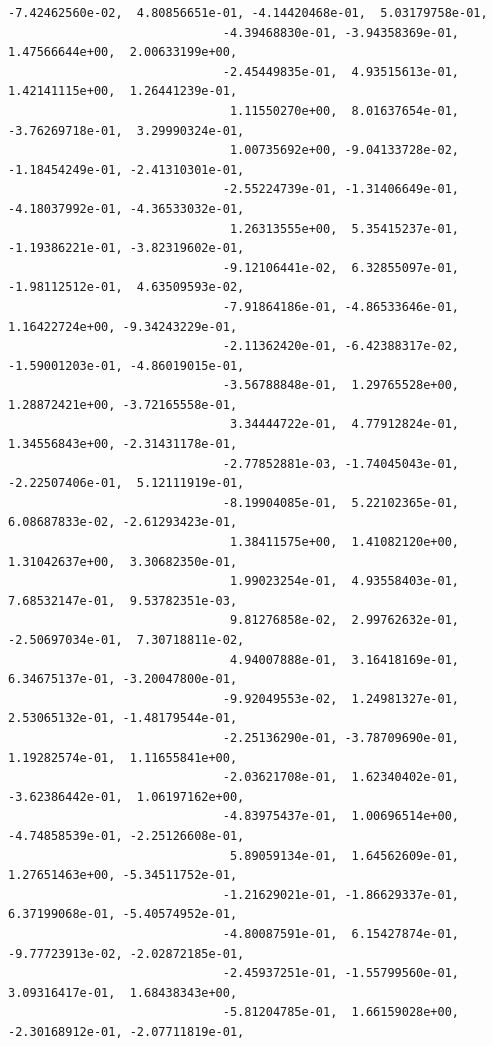 \documentclass[11pt]{article}
\begin{document}
\begin{Verbatim}[commandchars=\\\{\}]
                              -7.42462560e-02,  4.80856651e-01, -4.14420468e-01,  5.03179758e-01,
                              -4.39468830e-01, -3.94358369e-01,  1.47566644e+00,  2.00633199e+00,
                              -2.45449835e-01,  4.93515613e-01,  1.42141115e+00,  1.26441239e-01,
                               1.11550270e+00,  8.01637654e-01, -3.76269718e-01,  3.29990324e-01,
                               1.00735692e+00, -9.04133728e-02, -1.18454249e-01, -2.41310301e-01,
                              -2.55224739e-01, -1.31406649e-01, -4.18037992e-01, -4.36533032e-01,
                               1.26313555e+00,  5.35415237e-01, -1.19386221e-01, -3.82319602e-01,
                              -9.12106441e-02,  6.32855097e-01, -1.98112512e-01,  4.63509593e-02,
                              -7.91864186e-01, -4.86533646e-01,  1.16422724e+00, -9.34243229e-01,
                              -2.11362420e-01, -6.42388317e-02, -1.59001203e-01, -4.86019015e-01,
                              -3.56788848e-01,  1.29765528e+00,  1.28872421e+00, -3.72165558e-01,
                               3.34444722e-01,  4.77912824e-01,  1.34556843e+00, -2.31431178e-01,
                              -2.77852881e-03, -1.74045043e-01, -2.22507406e-01,  5.12111919e-01,
                              -8.19904085e-01,  5.22102365e-01,  6.08687833e-02, -2.61293423e-01,
                               1.38411575e+00,  1.41082120e+00,  1.31042637e+00,  3.30682350e-01,
                               1.99023254e-01,  4.93558403e-01,  7.68532147e-01,  9.53782351e-03,
                               9.81276858e-02,  2.99762632e-01, -2.50697034e-01,  7.30718811e-02,
                               4.94007888e-01,  3.16418169e-01,  6.34675137e-01, -3.20047800e-01,
                              -9.92049553e-02,  1.24981327e-01,  2.53065132e-01, -1.48179544e-01,
                              -2.25136290e-01, -3.78709690e-01,  1.19282574e-01,  1.11655841e+00,
                              -2.03621708e-01,  1.62340402e-01, -3.62386442e-01,  1.06197162e+00,
                              -4.83975437e-01,  1.00696514e+00, -4.74858539e-01, -2.25126608e-01,
                               5.89059134e-01,  1.64562609e-01,  1.27651463e+00, -5.34511752e-01,
                              -1.21629021e-01, -1.86629337e-01,  6.37199068e-01, -5.40574952e-01,
                              -4.80087591e-01,  6.15427874e-01, -9.77723913e-02, -2.02872185e-01,
                              -2.45937251e-01, -1.55799560e-01,  3.09316417e-01,  1.68438343e+00,
                              -5.81204785e-01,  1.66159028e+00, -2.30168912e-01, -2.07711819e-01,

\end{Verbatim}
\end{document}
